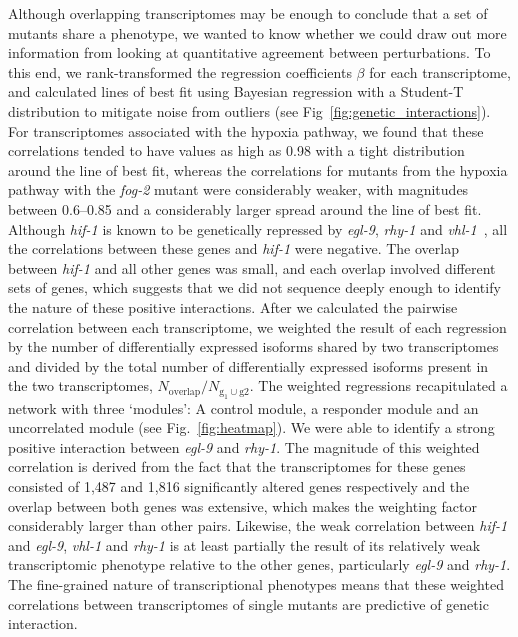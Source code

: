 \documentclass[9pt,twocolumn,twoside]{pnas-new}
\newcommand{\egl}{\emph{egl-9}}
\newcommand{\rhy}{\emph{rhy-1}}
\newcommand{\vhl}{\emph{vhl-1}}
\newcommand{\hif}{\emph{hif-1}}
\newcommand{\fog}{\emph{fog-2}}
\newcommand{\egln}{1,487}
\newcommand{\rhyn}{1,816}
\begin{document}
Although overlapping transcriptomes may be enough to conclude that a set of mutants
share a phenotype, we wanted to know whether we could draw out more information from
looking at quantitative agreement between perturbations. To this end, we rank-transformed
the regression coefficients $\beta$ for each transcriptome, and calculated lines
of best fit using Bayesian regression with a Student-T distribution to mitigate
noise from outliers (see Fig~\ref{fig:genetic_interactions}). For transcriptomes
associated with the hypoxia pathway, we found that these correlations tended to have
values as high as 0.98 with a tight distribution around the line of best fit,
whereas the correlations for mutants from the hypoxia pathway
with the \fog{} mutant were considerably weaker, with magnitudes between
0.6--0.85 and a considerably larger spread around the line of best fit.
Although \hif{} is known to be genetically repressed by \egl{}, \rhy{} and
\vhl{}~\cite{Epstein2001}, all the correlations
between these genes and \hif{} were negative. The overlap between
\hif{} and all other genes was small, and each overlap involved
different sets of genes, which suggests that we did not sequence deeply enough
to identify the nature of these positive interactions.
After we calculated the pairwise correlation between each transcriptome,
we weighted the result of each regression by the
number of differentially expressed isoforms shared by two transcriptomes and
divided by the total number of differentially expressed isoforms present in the
two transcriptomes, $N_\mathrm{overlap}/N_{\mathrm{g_1} \cup \mathrm{g2}}$.
The weighted regressions recapitulated a network with three `modules': A control
module, a responder module and an uncorrelated module (see Fig.~\ref{fig:heatmap}).
We were able to identify a strong positive interaction between \egl{} and \rhy{}.
The magnitude of this weighted correlation is derived from the fact that the
transcriptomes for these genes consisted of \egln{} and \rhyn{} significantly
altered genes respectively and the overlap between both genes was
extensive, which makes the weighting factor considerably larger than other pairs.
Likewise, the weak correlation between \hif{} and \egl{}, \vhl{} and \rhy{} is at
least partially the result of its relatively weak transcriptomic phenotype relative
to the other genes, particularly \egl{} and \rhy{}.
The fine-grained nature of transcriptional phenotypes means that these weighted
correlations between transcriptomes of single mutants are predictive of genetic
interaction.
\end{document}
